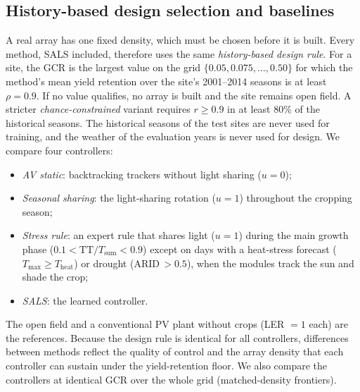 \subsection{History-based design selection and baselines}\label{sec:baselines}
A real array has one fixed density, which must be chosen before it is built. Every method, SALS included, therefore uses the same \emph{history-based design rule}. For a site, the GCR is the largest value on the grid $\{0.05,0.075,\dots,0.50\}$ for which the method's mean yield retention over the site's 2001--2014 seasons is at least $\rho=0.9$. If no value qualifies, no array is built and the site remains open field. A stricter \emph{chance-constrained} variant requires $r\ge0.9$ in at least 80\% of the historical seasons. The historical seasons of the test sites are never used for training, and the weather of the evaluation years is never used for design. We compare four controllers:
\begin{itemize}
\item \emph{AV static}: backtracking trackers without light sharing ($u=0$);
\item \emph{Seasonal sharing}: the light-sharing rotation ($u=1$) throughout the cropping season;
\item \emph{Stress rule}: an expert rule that shares light ($u=1$) during the main growth phase ($0.1<\mathrm{TT}/T_{\mathrm{sum}}<0.9$) except on days with a heat-stress forecast ($T_{\max}\ge T_{\mathrm{heat}}$) or drought (ARID\,$>0.5$), when the modules track the sun and shade the crop;
\item \emph{SALS}: the learned controller.
\end{itemize}
The open field and a conventional PV plant without crops (LER $=1$ each) are the references. Because the design rule is identical for all controllers, differences between methods reflect the quality of control and the array density that each controller can sustain under the yield-retention floor. We also compare the controllers at identical GCR over the whole grid (matched-density frontiers).

